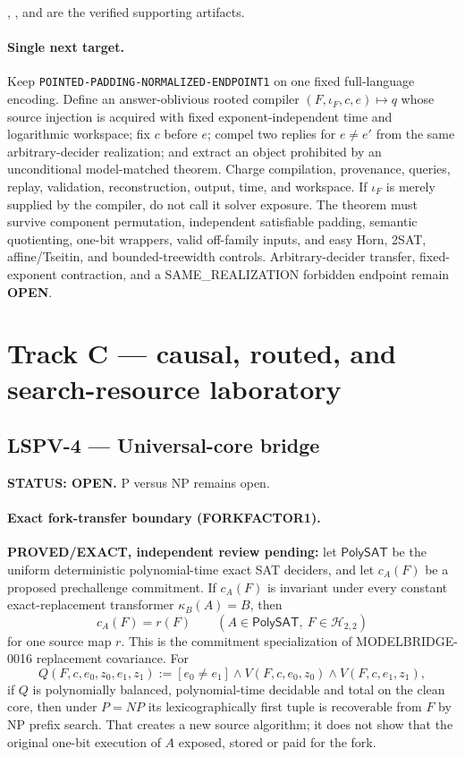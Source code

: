 \documentclass[11pt]{article}
\begin{document}
,
, and
are the verified supporting artifacts.

\paragraph{Single next target.}
Keep \texttt{POINTED-PADDING-NORMALIZED-ENDPOINT1} on one fixed full-language
encoding.  Define an answer-oblivious rooted compiler
\((F,\iota_F,c,e)\mapsto q\) whose source injection is acquired with fixed
exponent-independent time and logarithmic workspace; fix \(c\) before \(e\);
compel two replies for \(e\ne e'\) from the same arbitrary-decider
realization; and extract an object prohibited by an unconditional
model-matched theorem.  Charge compilation, provenance, queries, replay,
validation, reconstruction, output, time, and workspace.  If \(\iota_F\) is
merely supplied by the compiler, do not call it solver exposure.  The theorem
must survive component permutation, independent satisfiable padding, semantic
quotienting, one-bit wrappers, valid off-family inputs, and easy Horn, 2SAT,
affine/Tseitin, and bounded-treewidth controls.  Arbitrary-decider transfer,
fixed-exponent contraction, and a SAME\_REALIZATION forbidden endpoint remain
\textbf{OPEN}.

\section{Track C --- causal, routed, and search-resource laboratory}

\subsection{LSPV-4 --- Universal-core bridge}
\textbf{STATUS: OPEN.} P versus NP remains open.

\paragraph{Exact fork-transfer boundary (FORKFACTOR1).}
\textbf{PROVED/EXACT, independent review pending:} let
\(\mathsf{PolySAT}\) be the uniform deterministic polynomial-time exact SAT
deciders, and let \(c_A(F)\) be a proposed prechallenge commitment.  If
\(c_A(F)\) is invariant under every constant exact-replacement transformer
\(\kappa_B(A)=B\), then
\[
 c_A(F)=r(F)\qquad
 (A\in\mathsf{PolySAT},\ F\in\mathcal H_{2,2})
\]
for one source map \(r\).  This is the commitment specialization of
MODELBRIDGE-0016 replacement covariance.  For
\[
 Q(F,c,e_0,z_0,e_1,z_1):=[e_0\ne e_1]\wedge
 V(F,c,e_0,z_0)\wedge V(F,c,e_1,z_1),
\]
if \(Q\) is polynomially balanced, polynomial-time decidable and total on
the clean core, then under \(P=NP\) its lexicographically first tuple is
recoverable from \(F\) by NP prefix search.  That creates a new source
algorithm; it does not show that the original one-bit execution of \(A\)
exposed, stored or paid for the fork.
\end{document}

